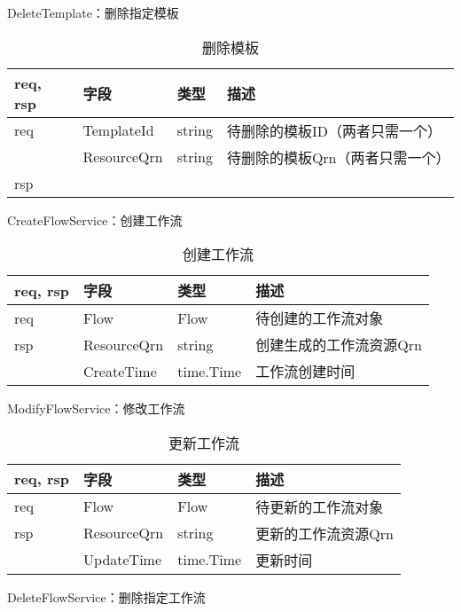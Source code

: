 DeleteTemplate：删除指定模板


\begin{table}[H]
    \centering
    \caption{删除模板}
    \label{tab:design-interface-template-delete}
    \begin{tabular}{llll}
        \toprule
        req, rsp   & 字段 & 类型 & 描述 \\
        \midrule
        req & TemplateId & string & 待删除的模板ID（两者只需一个） \\
        & ResourceQrn & string & 待删除的模板Qrn（两者只需一个） \\ \hline
        rsp & & & \\
        \bottomrule
    \end{tabular}
\end{table}

CreateFlowService：创建工作流

\begin{table}[H]
    \centering
    \caption{创建工作流}
    \label{tab:design-interface-flow-create}
    \begin{tabular}{llll}
        \toprule
        req, rsp   & 字段 & 类型 & 描述 \\
        \midrule
        req & Flow & Flow & 待创建的工作流对象 \\ \hline
        rsp & ResourceQrn & string & 创建生成的工作流资源Qrn \\
        & CreateTime & time.Time & 工作流创建时间 \\
        \bottomrule
    \end{tabular}
\end{table}

ModifyFlowService：修改工作流

\begin{table}[H]
    \centering
    \caption{更新工作流}
    \label{tab:design-interface-flow-modify}
    \begin{tabular}{llll}
        \toprule
        req, rsp   & 字段 & 类型 & 描述 \\
        \midrule
        req & Flow & Flow & 待更新的工作流对象 \\ \hline
        rsp & ResourceQrn & string & 更新的工作流资源Qrn \\
        & UpdateTime & time.Time & 更新时间 \\
        \bottomrule
    \end{tabular}
\end{table}


DeleteFlowService：删除指定工作流

